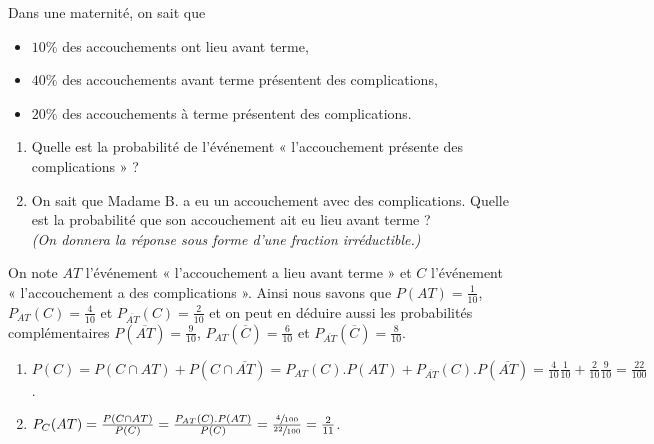 \documentclass[a4paper,12pt,reqno]{amsart}
\begin{document}
\begin{exo}

  Dans une maternité, on sait que
  \begin{itemize}
    \item $10 \%$ des accouchements ont lieu avant terme,
    \item $40 \%$ des accouchements avant terme présentent des complications,
    \item $20 \%$ des accouchements à terme présentent des complications.
  \end{itemize}
  \begin{enumerate}
    \item Quelle est la probabilité de l'événement « l'accouchement présente des complications » ?
    \item On sait que Madame B. a eu un accouchement avec des complications. Quelle est la probabilité que son accouchement ait eu lieu avant terme ?\\
    \emph{(On donnera la réponse sous forme d'une fraction irréductible.)}
\end{enumerate}

\end{exo}

\begin{solution}
  On note $AT$ l'événement « l'accouchement a lieu avant terme » et $C$ l'événement « l'accouchement a des complications ». Ainsi nous savons que $P(AT)=\frac{1}{10}$, $P_{AT}(C)=\frac{4}{10}$ et $P_{\overline{AT}}(C)=\frac{2}{10}$ et on peut en déduire aussi les probabilités complémentaires $P(\overline{AT})=\frac{9}{10}$, $P_{AT}(\overline{C})=\frac{6}{10}$ et $P_{\overline{AT}}(\overline{C})=\frac{8}{10}$.
  \begin{enumerate}
    \item $P(C) = P(C\cap AT) + P(C\cap \overline{AT})= P_{AT}(C).P(AT) + P_{\overline{AT}}(C).P(\overline{AT}) = \frac{4}{10}\frac{1}{10} + \frac{2}{10}\frac{9}{10} = \frac{22}{100}$.
    \item $P_{C}(AT) = \frac{P(C \cap AT)}{P(C)} = \frac{P_{AT}(C).P(AT)}{P(C)} = \frac{\sfrac{4}{100}}{\sfrac{22}{100}} = \frac{2}{11}$.
  \end{enumerate}

\end{solution}
\end{document}
